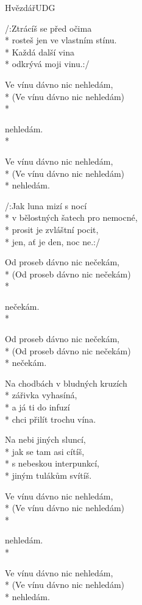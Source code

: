 \documentclass[10.5pt]{book}
\begin{document}
\begin{poem}{Hvězdář}{UDG}

\settowidth{\versewidth}{v bělostných šatech pro nemocné,}

/:Ztrácíš se před očima\\*
rosteš jen ve vlastním stínu.\\*
Každá další vina\\*
odkrývá moji vinu.:/

\begin{altverse}
Ve vínu dávno nic nehledám, \\*
(Ve vínu dávno nic nehledám) \\*
\end{altverse}
nehledám.\\*
\begin{altverse}
Ve vínu dávno nic nehledám, \\*
(Ve vínu dávno nic nehledám) \\*
nehledám.
\end{altverse}

/:Jak luna mizí s nocí\\*
v bělostných šatech pro nemocné,\\*
prosit je zvláštní pocit,\\*
jen, ať je den, noc ne.:/

\begin{altverse}
Od proseb dávno nic nečekám, \\*
(Od proseb dávno nic nečekám) \\*
\end{altverse}
nečekám.\\*
\begin{altverse}
Od proseb dávno nic nečekám, \\*
(Od proseb dávno nic nečekám) \\*
nečekám.
\end{altverse}

Na chodbách v bludných kruzích \\*
zářivka vyhasíná,\\*
a já ti do infuzí \\*
chci přilít trochu vína.

Na nebi jiných sluncí, \\*
jak se tam asi cítíš,\\*
s nebeskou interpunkcí, \\*
jiným tulákům svítíš.

\begin{altverse}
Ve vínu dávno nic nehledám, \\*
(Ve vínu dávno nic nehledám) \\*
\end{altverse}
nehledám.\\*
\begin{altverse}
Ve vínu dávno nic nehledám, \\*
(Ve vínu dávno nic nehledám) \\*
nehledám.
\end{altverse}


\end{poem}
\end{document}
